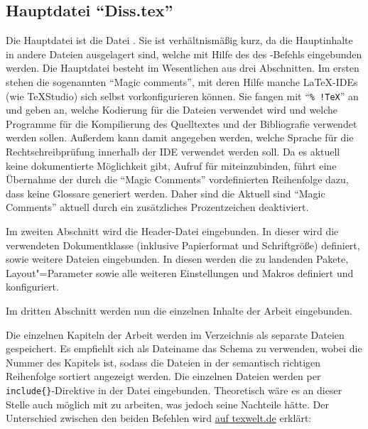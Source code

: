 \subsection[Hauptdatei \enquote{Diss.tex}]{Hauptdatei \enquote{Diss.tex}}%
%
\label{sec:Hauptdatei}
%
Die Hauptdatei ist die Datei .
Sie ist verhältnismäßig kurz, da die Hauptinhalte in andere Dateien ausgelagert sind, welche mit Hilfe des  \bzw des -Befehls eingebunden werden.
Die Hauptdatei besteht im Wesentlichen aus drei Abschnitten.
Im ersten stehen die sogenannten \enquote{Magic comments}, mit deren Hilfe manche \LaTeX-IDEs (wie \zB TeXStudio) sich selbst vorkonfigurieren können.
Sie fangen mit \enquote{\texttt{\%~!TeX}} an und geben an, welche Kodierung für die Dateien verwendet wird und welche Programme für die Kompilierung des Quelltextes und der Bibliografie verwendet werden sollen.
Außerdem kann damit angegeben werden, welche Sprache für die Rechtschreibprüfung innerhalb der IDE verwendet werden soll.
Da es aktuell keine dokumentierte Möglichkeit gibt, Aufruf für  miteinzubinden,
führt eine Übernahme der durch die \enquote{Magic Comments} vordefinierten Reihenfolge dazu, dass keine Glossare generiert werden.
Daher sind die Aktuell sind \enquote{Magic Comments} aktuell durch ein zusätzliches Prozentzeichen deaktiviert.

Im zweiten Abschnitt wird die Header-Datei eingebunden.
In dieser wird die verwendeten Dokumentklasse (inklusive Papierformat und Schriftgröße) definiert, sowie weitere Dateien eingebunden.
In diesen werden die zu landenden Pakete, Layout"=Parameter sowie alle weiteren Einstellungen und Makros definiert und konfiguriert.

Im dritten Abschnitt werden nun die einzelnen Inhalte der Arbeit eingebunden.

Die einzelnen Kapiteln der Arbeit werden im Verzeichnis  als separate Dateien gespeichert.
Es empfiehlt sich als Dateiname das Schema  zu verwenden, wobei  die Nummer des Kapitels ist,
sodass die Dateien in der semantisch richtigen Reihenfolge sortiert angezeigt werden.
Die einzelnen Dateien werden per \verb+include{}+-Direktive in der Datei  eingebunden.
Theoretisch wäre es an dieser Stelle auch möglich mit \verb++ zu arbeiten, was jedoch seine Nachteile hätte.
Der Unterschied zwischen den beiden Befehlen wird \href{https://texwelt.de/wissen/fragen/32/was-ist-der-unterschied-zwischen-include-and-input}{auf texwelt.de} erklärt:

